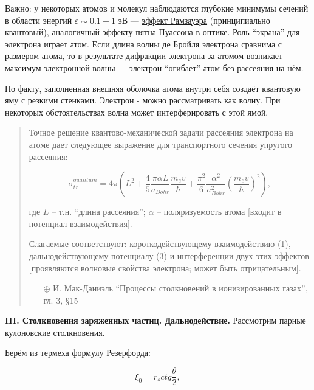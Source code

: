 \documentclass[10pt, a4paper]{article}
\begin{document}
Важно: у некоторых атомов и молекул наблюдаются глубокие минимумы сечений в области энергий $\varepsilon \sim 0.1-1$ эВ --- \uline{эффект Рамзауэра} \cite{raizer} (принципиально квантовый), аналогичный эффекту пятна Пуассона в оптике. Роль ``экрана'' для электрона играет атом. Если длина волны де Бройля электрона сравнима с размером атома, то в результате дифракции электрона за атомом возникает максимум электронной волны — электрон ``огибает'' атом без рассеяния на нём.

По факту, заполненная внешняя оболочка атома внутри себя создаёт квантовую яму с резкими стенками. Электрон - можно рассматривать как волну. При некоторых обстоятельствах волна может интерферировать с этой ямой. 

\begin{quotation}
	
	Точное решение квантово-механической задачи рассеяния электрона на атоме дает следующее выражение для транспортного сечения упругого рассеяния:
	
	\begin{equation*}
		\sigma_{tr}^{quantum} = 4\pi \left(L^{2}+\frac{4}{5}\frac{\pi \alpha L}{a_{Bohr}}\frac{m_ev}{\hbar}+\frac{\pi^{2}}{6}\frac{\alpha^{2}}{a_{Bohr}^{2}}\left( \frac{m_ev}{\hbar}\right) ^{2} \right), 
	\end{equation*}
	
	где $L$ -- т.н. ``длина рассеяния''; $\alpha$ -- поляризуемость атома [входит в потенциал взаимодействия].
	
	Слагаемые соответствуют: короткодействующему взаимодействию (1), дальнодействующему потенциалу (3) и интерференции двух этих эффектов [проявляются волновые свойства электрона; может быть отрицательным].
	
	\begin{itemize}
		\item[$\oplus$] И. Мак-Даниэль ``Процессы столкновений в ионизированных газах'', гл. 3, \S 15
	\end{itemize}
	
\end{quotation}

{\bfseries \large III. Столкновения заряженных частиц. Дальнодействие.} Рассмотрим парные кулоновские столкновения.

Берём из термеха \uline{формулу Резерфорда}:

\begin{equation} \label{eq:Rutherford}
	\xi_0 = r_s ctg\frac{\theta}{2},
\end{equation}
\end{document}

